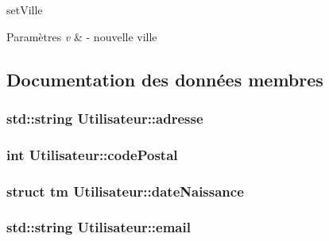set\-Ville 


\begin{DoxyParams}{Paramètres}
{\em v} & -\/ nouvelle ville \\
\hline
\end{DoxyParams}


\subsection{Documentation des données membres}
\hypertarget{class_utilisateur_a6a969b59bb72c45ab1022f9b231cd7ad}{
\subsubsection[{adresse}]{\setlength{\rightskip}{0pt plus 5cm}std\-::string Utilisateur\-::adresse\hspace{0.3cm}{\ttfamily [protected]}}}\label{class_utilisateur_a6a969b59bb72c45ab1022f9b231cd7ad}
\hypertarget{class_utilisateur_aeff227b441e9a3b159e6718d027d9479}{
\subsubsection[{code\-Postal}]{\setlength{\rightskip}{0pt plus 5cm}int Utilisateur\-::code\-Postal\hspace{0.3cm}{\ttfamily [protected]}}}\label{class_utilisateur_aeff227b441e9a3b159e6718d027d9479}
\hypertarget{class_utilisateur_a1e39a6fceaafa481ff806f6aca19965c}{
\subsubsection[{date\-Naissance}]{\setlength{\rightskip}{0pt plus 5cm}struct tm Utilisateur\-::date\-Naissance\hspace{0.3cm}{\ttfamily [protected]}}}\label{class_utilisateur_a1e39a6fceaafa481ff806f6aca19965c}
\hypertarget{class_utilisateur_ac8b4c8a7164bcd8d2d342d976ea27c56}{
\subsubsection[{email}]{\setlength{\rightskip}{0pt plus 5cm}std\-::string Utilisateur\-::email\hspace{0.3cm}{\ttfamily [protected]}}}\label{class_utilisateur_ac8b4c8a7164bcd8d2d342d976ea27c56}

